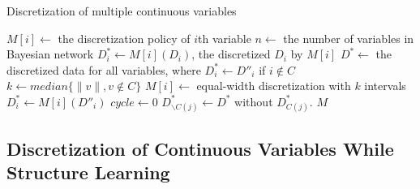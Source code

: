 \begin{algorithm}
\caption{ Discretization of multiple continuous variables}
\begin{algorithmic}[5]
\State
\State $M[i] \leftarrow$ the discretization policy of $i$th variable
\State $n \leftarrow$ the number of variables in Bayesian network
\State $D^*_i \leftarrow M[i] (D_i)$, the discretized $D_i$ by $M[i]$
\State $D^* \leftarrow $ the discretized data for all variables, where $D^*_i \leftarrow D''_i$ if $i \notin C$
\State $k \leftarrow median\{ \|v\|, v\notin C\}$
\State
{}
\State $M[i] \leftarrow$  equal-width discretization with $k$ intervals
\State $D^*_i \leftarrow  M[i] (D''_i)$
\EndIf
\EndFor
\State
\State $cycle \leftarrow 0$
\State $D^*_{\backslash C(j)} \leftarrow D^*$ without $D^*_{C(j)}$.
\EndFor
\EndWhile
\State \Return $M$
\EndFunction
\end{algorithmic}
\end{algorithm}

\subsection{Discretization of Continuous Variables While Structure Learning}

